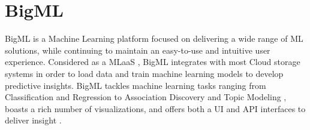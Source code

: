 \section{BigML}

BigML \cite{hid-sp18-504-cloudacad-bigml} is a Machine Learning platform
focused on delivering a wide range of ML solutions, while continuing to 
maintain an easy-to-use and intuitive user experience. Considered as 
a MLaaS \cite{hid-sp18-504-cloudacad-bigml}, BigML integrates with most 
Cloud storage systems in order to load data and train machine learning 
models to develop predictive insights. BigML tackles machine learning tasks 
ranging from Classification and Regression to Association Discovery and 
Topic Modeling \cite{hid-sp18-504-bigml}, boasts a rich number of 
visualizations, and offers both a UI and API interfaces to deliver 
insight \cite{hid-sp18-504-cloudacad-bigml}.
